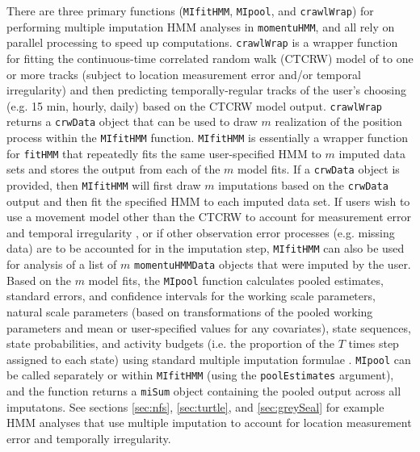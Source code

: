 \documentclass[12pt]{article}
\begin{document}
There are three primary functions (\verb|MIfitHMM|, \verb|MIpool|, and \verb|crawlWrap|) for performing multiple imputation HMM analyses in \verb|momentuHMM|, and all rely on parallel processing to speed up computations. \verb|crawlWrap| is a wrapper function for fitting the continuous-time correlated random walk (CTCRW) model of \cite{JohnsonEtAl2008} to one or more tracks (subject to location measurement error and/or temporal irregularity) and then predicting temporally-regular tracks of the user's choosing (e.g. 15 min, hourly, daily) based on the CTCRW model output.  \verb|crawlWrap| returns a \verb|crwData| object that can be used to draw $m$ realization of the position process within the \verb|MIfitHMM| function.  \verb|MIfitHMM| is essentially a wrapper function for \verb|fitHMM| that repeatedly fits the same user-specified HMM to $m$ imputed data sets and stores the output from each of the $m$ model fits. If a \verb|crwData| object is provided, then \verb|MIfitHMM| will first draw $m$ imputations based on the \verb|crwData| output and then fit the specified HMM to each imputed data set. If users wish to use a movement model other than the CTCRW to account for measurement error and temporal irregularity \citep[e.g.][]{CalabreseEtAl2016,GurarieEtAl2017}, or if other observation error processes (e.g. missing data) are to be accounted for in the imputation step, \verb|MIfitHMM| can also be used for analysis of a list of $m$ \verb|momentuHMMData| objects that were imputed by the user. Based on the $m$ model fits, the \verb|MIpool| function calculates pooled estimates, standard errors, and confidence intervals for the working scale parameters, natural scale parameters (based on transformations of the pooled working parameters and mean or user-specified values for any covariates), state sequences, state probabilities, and activity budgets (i.e. the proportion of the $T$ times step assigned to each state) using standard multiple imputation formulae \citep{RubinSchenker1986,McClintock2017}.  \verb|MIpool| can be called separately or within \verb|MIfitHMM| (using the \verb|poolEstimates| argument), and the function returns a \verb|miSum| object containing the pooled output across all imputatons. See sections \ref{sec:nfs}, \ref{sec:turtle}, and \ref{sec:greySeal} for example HMM analyses that use multiple imputation to account for location measurement error and temporally irregularity.
\end{document}

